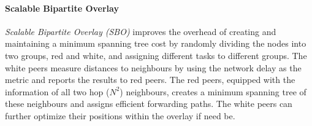 \documentclass[acmcsur]{acmtrans2m}
\begin{document}
\paragraph*{\bf Scalable Bipartite Overlay}

\emph{Scalable Bipartite Overlay (SBO)}
\cite{liu_bipartite_IPDPS,liu_bipartite_2007} improves the overhead of creating
and maintaining a minimum spanning tree cost by randomly dividing the nodes into
two groups, red and white, and assigning different tasks to different groups.
The white peers measure distances to neighbours by using the network delay as
the metric and reports the results to red peers. The red peers, equipped with the
information of all two hop ($N^2$) neighbours, creates a minimum spanning tree
of these neighbours and assigns efficient forwarding paths. The white peers can
further optimize their positions within the overlay if need be.
\end{document}
